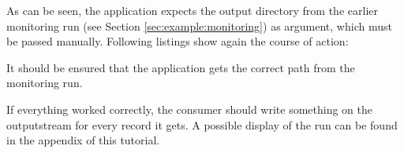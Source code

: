 \setJavaCodeListing       

As can be seen, the application expects the output directory from the earlier monitoring run (see Section \ref{sec:example:monitoring}) as argument, which must be passed manually. Following listings show again the course of action:
\setBashListing 		
	
	
It should be ensured that the application gets the correct path from the monitoring run. 

If everything worked correctly, the consumer should write something on the outputstream for every record it gets. A possible display of the run can be found in the appendix of this tutorial. 